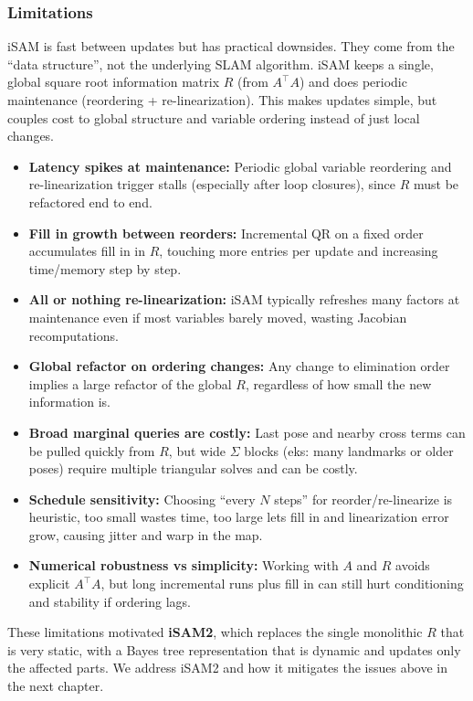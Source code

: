 \subsubsection{Limitations}
iSAM is fast between updates but has practical downsides. They come from the ``data structure'', not the underlying SLAM algorithm. iSAM keeps a single, global square root information matrix $R$ (from $A^\top A$) and does periodic maintenance (reordering + re-linearization). This makes updates simple, but couples cost to global structure and variable ordering instead of just local changes.
\begin{itemize}
    \item \textbf{Latency spikes at maintenance:} Periodic global variable reordering and re-linearization trigger stalls (especially after loop closures), since $R$ must be refactored end to end.

    \item \textbf{Fill in growth between reorders:} Incremental QR on a fixed order accumulates fill in in $R$, touching more entries per update and increasing time/memory step by step.

    \item \textbf{All or nothing re-linearization:} iSAM typically refreshes many factors at maintenance even if most variables barely moved, wasting Jacobian recomputations.

    \item \textbf{Global refactor on ordering changes:} Any change to elimination order implies a large refactor of the global $R$, regardless of how small the new information is.

    \item \textbf{Broad marginal queries are costly:} Last pose and nearby cross terms can be pulled quickly from $R$, but wide $\Sigma$ blocks (eks: many landmarks or older poses) require multiple triangular solves and can be costly.

    \item \textbf{Schedule sensitivity:} Choosing ``every $N$ steps'' for reorder/re-linearize is heuristic, too small wastes time, too large lets fill in and linearization error grow, causing jitter and warp in the map.

    \item \textbf{Numerical robustness vs simplicity:} Working with $A$ and $R$ avoids explicit $A^\top A$, but long incremental runs plus fill in can still hurt conditioning and stability if ordering lags.
\end{itemize}
\noindent
These limitations motivated \textbf{iSAM2}, which replaces the single monolithic $R$ that is very static, with a Bayes tree representation that is dynamic and updates only the affected parts. We address iSAM2 and how it mitigates the issues above in the next chapter.

